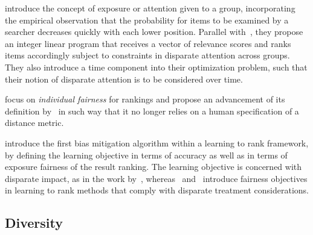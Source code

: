 \citet{singh2018fairness} introduce the concept of exposure or attention given to a group, incorporating the empirical observation that the probability for items to be examined by a searcher decreases quickly with each lower position.
%
Parallel with~\citet{biega2018equity}, they propose an integer linear program that receives a vector of relevance scores and ranks items accordingly subject to constraints in disparate attention across groups. They also introduce a time component into their optimization problem, such that their notion of disparate attention is to be considered over time.

\citet{lahoti2019operationalizing} focus on \emph{individual fairness} for rankings and propose an advancement of its definition by~\citet{Dwork2012} in such way that it no longer relies on a human specification of a distance metric.

\citet{zehlike2018reducing} introduce the first bias mitigation algorithm within a learning to rank framework, by defining the learning objective in terms of accuracy as well as in terms of exposure fairness of the result ranking.
%
The learning objective is concerned with disparate impact,
as in the work by~\citet{shang2020list},
whereas~\citet{beutel2019fairness} and~\citet{singh2019policy} introduce fairness objectives in learning to rank methods that comply with disparate treatment considerations.


\subsection{Diversity}

